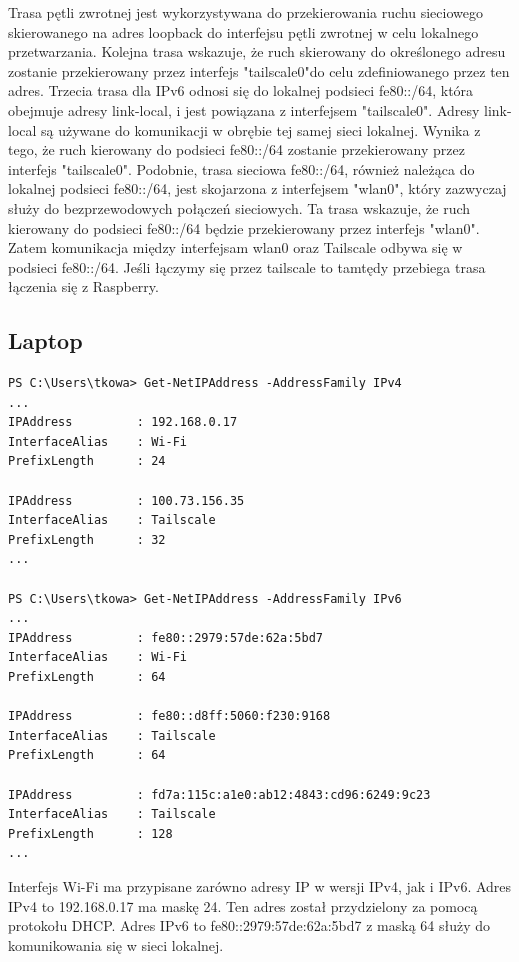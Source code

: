 \documentclass{article}
\begin{document}
Trasa pętli zwrotnej jest wykorzystywana do przekierowania ruchu sieciowego skierowanego na adres loopback do interfejsu pętli zwrotnej w celu lokalnego przetwarzania. Kolejna trasa wskazuje, że ruch skierowany do określonego adresu zostanie przekierowany przez interfejs "tailscale0"do celu zdefiniowanego przez ten adres. Trzecia trasa dla IPv6 odnosi się do lokalnej podsieci fe80::/64, która obejmuje adresy link-local, i jest powiązana z interfejsem "tailscale0". Adresy link-local są używane do komunikacji w obrębie tej samej sieci lokalnej. Wynika z tego, że ruch kierowany do podsieci fe80::/64 zostanie przekierowany przez interfejs "tailscale0". Podobnie, trasa sieciowa fe80::/64, również należąca do lokalnej podsieci fe80::/64, jest skojarzona z interfejsem "wlan0", który zazwyczaj służy do bezprzewodowych połączeń sieciowych. Ta trasa wskazuje, że ruch kierowany do podsieci fe80::/64 będzie przekierowany przez interfejs "wlan0".\\

Zatem komunikacja między interfejsam wlan0 oraz Tailscale odbywa się w podsieci fe80::/64. Jeśli łączymy się przez tailscale to tamtędy przebiega trasa łączenia się z Raspberry.\cite{stevens1994tcp}

\subsection*{Laptop}
\begin{lstlisting}
PS C:\Users\tkowa> Get-NetIPAddress -AddressFamily IPv4
...
IPAddress         : 192.168.0.17
InterfaceAlias    : Wi-Fi
PrefixLength      : 24

IPAddress         : 100.73.156.35
InterfaceAlias    : Tailscale
PrefixLength      : 32
...

PS C:\Users\tkowa> Get-NetIPAddress -AddressFamily IPv6
...
IPAddress         : fe80::2979:57de:62a:5bd7
InterfaceAlias    : Wi-Fi
PrefixLength      : 64

IPAddress         : fe80::d8ff:5060:f230:9168
InterfaceAlias    : Tailscale
PrefixLength      : 64

IPAddress         : fd7a:115c:a1e0:ab12:4843:cd96:6249:9c23
InterfaceAlias    : Tailscale
PrefixLength      : 128
...
\end{lstlisting}
Interfejs Wi-Fi ma przypisane zarówno adresy IP w wersji IPv4, jak i IPv6. Adres IPv4 to 192.168.0.17 ma maskę 24. Ten adres został przydzielony za pomocą protokołu DHCP. Adres IPv6 to fe80::2979:57de:62a:5bd7 z maską 64 służy do komunikowania się w sieci lokalnej.\\
\end{document}
